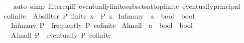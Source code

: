 \begin{isabellebody}
%
\isadelimproof
\ \ %
\endisadelimproof
%
\isatagproof
{}\isamarkupfalse%
\ {\isacharparenleft}{\kern0pt}auto\ simp{\isacharcolon}{\kern0pt}\ filter{\isacharunderscore}{\kern0pt}eq{\isacharunderscore}{\kern0pt}iff\ eventually{\isacharunderscore}{\kern0pt}finite{\isacharunderscore}{\kern0pt}subsets{\isacharunderscore}{\kern0pt}at{\isacharunderscore}{\kern0pt}top{\isacharunderscore}{\kern0pt}finite\ eventually{\isacharunderscore}{\kern0pt}principal{\isacharparenright}{\kern0pt}%
\endisatagproof
{\isafoldproof}%
%
\isadelimproof
%
\endisadelimproof
%
\isadelimdocument
%
\endisadelimdocument
%
\isatagdocument
%
\isamarkuptrue%
%
\endisatagdocument
{\isafolddocument}%
%
\isadelimdocument
%
\endisadelimdocument
{}\isamarkupfalse%
\ {\isachardoublequoteopen}cofinite\ {\isacharequal}{\kern0pt}\ Abs{\isacharunderscore}{\kern0pt}filter\ {\isacharparenleft}{\kern0pt}{\isasymlambda}P{\isachardot}{\kern0pt}\ finite\ {\isacharbraceleft}{\kern0pt}x{\isachardot}{\kern0pt}\ {\isasymnot}\ P\ x{\isacharbraceright}{\kern0pt}{\isacharparenright}{\kern0pt}{\isachardoublequoteclose}\isanewline
\isanewline
{}\isamarkupfalse%
\ Inf{\isacharunderscore}{\kern0pt}many\ {\isacharcolon}{\kern0pt}{\isacharcolon}{\kern0pt}\ {\isachardoublequoteopen}{\isacharparenleft}{\kern0pt}{\isacharprime}{\kern0pt}a\ {\isasymRightarrow}\ bool{\isacharparenright}{\kern0pt}\ {\isasymRightarrow}\ bool{\isachardoublequoteclose}\ \ {\isacharparenleft}{\kern0pt}\ {\isachardoublequoteopen}{\isasymexists}\isactrlsub {\isasyminfinity}{\isachardoublequoteclose}\ {}{}{\isacharparenright}{\kern0pt}\isanewline
\ \ \ {\isachardoublequoteopen}Inf{\isacharunderscore}{\kern0pt}many\ P\ {\isasymequiv}\ frequently\ P\ cofinite{\isachardoublequoteclose}\isanewline
\isanewline
{}\isamarkupfalse%
\ Alm{\isacharunderscore}{\kern0pt}all\ {\isacharcolon}{\kern0pt}{\isacharcolon}{\kern0pt}\ {\isachardoublequoteopen}{\isacharparenleft}{\kern0pt}{\isacharprime}{\kern0pt}a\ {\isasymRightarrow}\ bool{\isacharparenright}{\kern0pt}\ {\isasymRightarrow}\ bool{\isachardoublequoteclose}\ \ {\isacharparenleft}{\kern0pt}\ {\isachardoublequoteopen}{\isasymforall}\isactrlsub {\isasyminfinity}{\isachardoublequoteclose}\ {}{}{\isacharparenright}{\kern0pt}\isanewline
\ \ \ {\isachardoublequoteopen}Alm{\isacharunderscore}{\kern0pt}all\ P\ {\isasymequiv}\ eventually\ P\ cofinite{\isachardoublequoteclose}\isanewline

\end{isabellebody}
